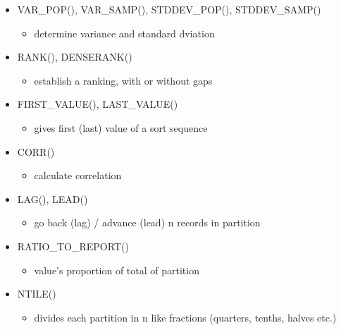 \begin{breakbox}
\begin{itemize}
	\item VAR\_POP(), VAR\_SAMP(), STDDEV\_POP(), STDDEV\_SAMP()
	\begin{itemize}
		\item determine variance and standard dviation
	\end{itemize}
	\item RANK(), DENSERANK()
	\begin{itemize}
		\item establish a ranking, with or without gaps
	\end{itemize}
	\item FIRST\_VALUE(), LAST\_VALUE()
	\begin{itemize}
		\item gives first (last) value of a sort sequence
	\end{itemize}
	\item CORR()
	\begin{itemize}
		\item calculate correlation
	\end{itemize}
	\item LAG(), LEAD()
	\begin{itemize}
		\item go back (lag) / advance (lead) n records in partition
	\end{itemize}
	\item RATIO\_TO\_REPORT()
	\begin{itemize}
		\item value's proportion of total of partition
	\end{itemize}
	\item NTILE()
	\begin{itemize}
		\item divides each partition in n like fractions (quarters, tenths, halves etc.)
	\end{itemize}
\end{itemize}	
\end{breakbox}

